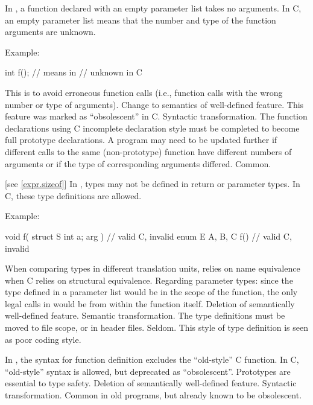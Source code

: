 \change
In \Cpp{}, a function declared with an empty parameter list takes no arguments.
In C, an empty parameter list means that the number and type of the function arguments are unknown.

Example:
\begin{codeblock}
int f();            // means    in \Cpp{}
                    //  unknown \tcode{)} in C
\end{codeblock}

\rationale
This is to avoid erroneous function calls (i.e., function calls
with the wrong number or type of arguments).
\effect
Change to semantics of well-defined feature.
This feature was marked as ``obsolescent'' in C.
\difficulty
Syntactic transformation.
The function declarations using C incomplete declaration style must
be completed to become full prototype declarations.
A program may need to be updated further if different calls to the
same (non-prototype) function have different numbers of arguments or
if the type of corresponding arguments differed.
\howwide
Common.

 [see \ref{expr.sizeof}]
\change
In \Cpp{}, types may not be defined in return or parameter types.
In C, these type definitions are allowed.

Example:
\begin{codeblock}
void f( struct S { int a; } arg ) {}    // valid C, invalid \Cpp{}
enum E { A, B, C } f() {}               // valid C, invalid \Cpp{}
\end{codeblock}

\rationale
When comparing types in different translation units, \Cpp{} relies
on name equivalence when C relies on structural equivalence.
Regarding parameter types: since the type defined in a parameter list
would be in the scope of the function, the only legal calls in \Cpp{}
would be from within the function itself.
\effect
Deletion of semantically well-defined feature.
\difficulty
Semantic transformation.
The type definitions must be moved to file scope, or in header files.
\howwide
Seldom.
This style of type definition is seen as poor coding style.

\change
In \Cpp{}, the syntax for function definition excludes the ``old-style'' C function.
In C, ``old-style'' syntax is allowed, but deprecated as ``obsolescent''.
\rationale
Prototypes are essential to type safety.
\effect
Deletion of semantically well-defined feature.
\difficulty
Syntactic transformation.
\howwide
Common in old programs, but already known to be obsolescent.

